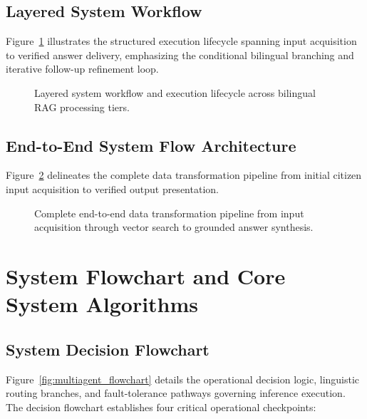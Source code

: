 \documentclass[12pt,a4paper]{report}
\begin{document}
\subsection{Layered System Workflow}
Figure~\ref{fig:arch_workflow} illustrates the structured execution lifecycle spanning input acquisition to verified answer delivery, emphasizing the conditional bilingual branching and iterative follow-up refinement loop.

\begin{figure}[htbp]
    \centering
    \caption{Layered system workflow and execution lifecycle across bilingual RAG processing tiers.}
    \label{fig:arch_workflow}
\end{figure}

\subsection{End-to-End System Flow Architecture}
Figure~\ref{fig:system_flow} delineates the complete data transformation pipeline from initial citizen input acquisition to verified output presentation.

\begin{figure}[htbp]
    \centering
    \caption{Complete end-to-end data transformation pipeline from input acquisition through vector search to grounded answer synthesis.}
    \label{fig:system_flow}
\end{figure}

\section{System Flowchart and Core System Algorithms}

\subsection{System Decision Flowchart}
Figure~\ref{fig:multiagent_flowchart} details the operational decision logic, linguistic routing branches, and fault-tolerance pathways governing inference execution. The decision flowchart establishes four critical operational checkpoints:
\end{document}
